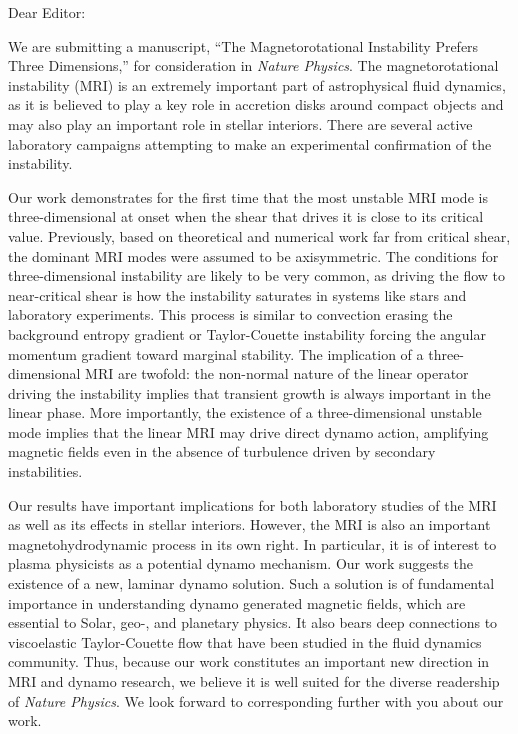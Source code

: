 \documentclass{letter}
\begin{document}
\begin{letter}{}
  \opening{Dear Editor:}

  We are submitting a manuscript, ``The Magnetorotational Instability Prefers Three Dimensions,'' for consideration in \emph{Nature Physics}.
The magnetorotational instability (MRI) is an extremely important part of astrophysical fluid dynamics, as it is believed to play a key role in accretion disks around compact objects and may also play an important role in stellar interiors.
There are several active laboratory campaigns attempting to make an experimental confirmation of the instability.

Our work demonstrates for the first time that the most unstable MRI mode is three-dimensional at onset when the shear that drives it is close to its critical value.
Previously, based on theoretical and numerical work far from critical shear, the dominant MRI modes were assumed to be axisymmetric.
The conditions for three-dimensional instability are likely to be very common, as driving the flow to near-critical shear is how the instability saturates in systems like stars and laboratory experiments.
This process is similar to convection erasing the background entropy gradient or Taylor-Couette instability forcing the angular momentum gradient toward marginal stability.
The implication of a three-dimensional MRI are twofold: the non-normal nature of the linear operator driving the instability implies that transient growth is always important in the linear phase.
More importantly, the existence of a three-dimensional unstable mode implies that the linear MRI may drive direct dynamo action, amplifying magnetic fields even in the absence of turbulence driven by secondary instabilities.

Our results have important implications for both laboratory studies of the MRI as well as its effects in stellar interiors. 
However, the MRI is also an important magnetohydrodynamic process in its own right.
In particular, it is of interest to plasma physicists as a potential dynamo mechanism.
Our work suggests the existence of a new, laminar dynamo solution.
Such a solution is of fundamental importance in understanding dynamo generated magnetic fields, which are essential to Solar, geo-, and planetary physics.
It also bears deep connections to viscoelastic Taylor-Couette flow that have been studied in the fluid dynamics community. 
Thus, because our work constitutes an important new direction in MRI and dynamo research, we believe it is well suited for the diverse readership of \emph{Nature Physics}. We look forward to corresponding further with you about our work.


\end{letter}
\end{document}
